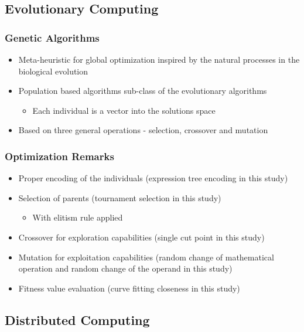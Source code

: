 \documentclass{beamer}
\begin{document}
\subsection{Evolutionary Computing}

\begin{frame}
\frametitle{Genetic Algorithms}
\begin{itemize}
	\item Meta-heuristic for global optimization inspired by the natural processes in the biological evolution
	\item Population based algorithms sub-class of the evolutionary algorithms
	\begin{itemize}
		\item Each individual is a vector into the solutions space
	\end{itemize}
	\item Based on three general operations - selection, crossover and mutation
\end{itemize}
\end{frame}

\begin{frame}
\frametitle{Optimization Remarks}
\begin{itemize}
	\item Proper encoding of the individuals (expression tree encoding in this study)
	\item Selection of parents (tournament selection in this study)
	\begin{itemize}
		\item With elitism rule applied
	\end{itemize}
	\item Crossover for exploration capabilities (single cut point in this study)
	\item Mutation for exploitation capabilities (random change of mathematical operation and random change of the operand in this study)
	\item Fitness value evaluation (curve fitting closeness in this study)
\end{itemize}
\end{frame}

\subsection{Distributed Computing}
\end{document}
